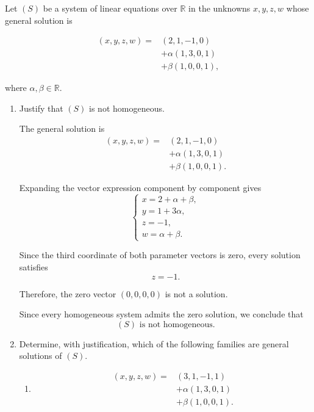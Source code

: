 \item Let $(S)$ be a system of linear equations over $\mathbb{R}$ in the unknowns $x,y,z,w$
whose general solution is

$$
\begin{aligned}
(x,y,z,w)
={}&(2,1,-1,0)\\
&+\alpha(1,3,0,1)\\
&+\beta(1,0,0,1),
\end{aligned}
$$

where $\alpha,\beta\in\mathbb{R}$.

\begin{enumerate}[label=\alph*)]

\item Justify that $(S)$ is not homogeneous.

\begin{answer}
    The general solution is
    $$
    \begin{aligned}
    (x,y,z,w)
    ={}&(2,1,-1,0)\\
    &+\alpha(1,3,0,1)\\
    &+\beta(1,0,0,1).
    \end{aligned}
    $$

    Expanding the vector expression
    component by component gives
    $$
    \begin{cases}
    x=2+\alpha+\beta,\\
    y=1+3\alpha,\\
    z=-1,\\
    w=\alpha+\beta.
    \end{cases}
    $$

    Since the third coordinate of both parameter vectors is zero, every solution satisfies
    $$
    z=-1.
    $$

    Therefore, the zero vector $(0,0,0,0)$ is not a solution.

    Since every homogeneous system admits the zero solution, we conclude that
    $$
    \boxed{(S)\text{ is not homogeneous}.}
    $$

\end{answer}

\item Determine, with justification, which of the following families are
general solutions of $(S)$.

\begin{enumerate}[label=\roman*)]

\item
$$
\begin{aligned}
(x,y,z,w)
={}&(3,1,-1,1)\\
&+\alpha(1,3,0,1)\\
&+\beta(1,0,0,1).
\end{aligned}
$$


\end{enumerate}
\end{enumerate}
